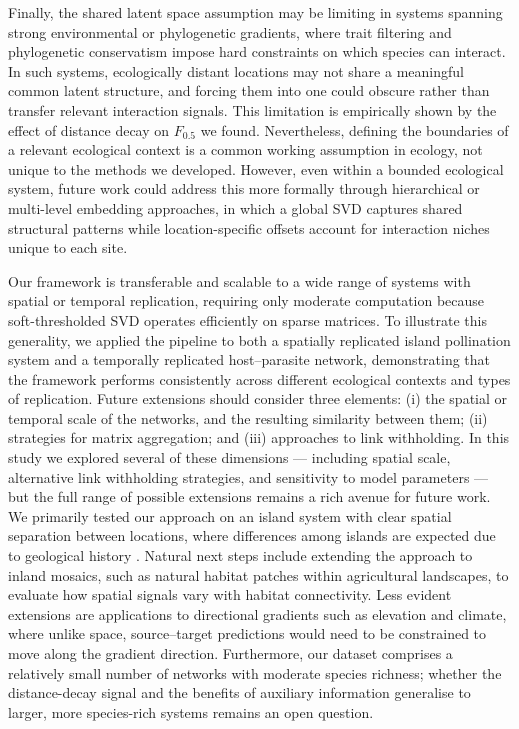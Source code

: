 \documentclass[oneside, a4paper, onecolumn, 11pt]{article}
\newcommand{\revtag}[1]{\textcolor{softcoral}{[#1]}}
\begin{document}
Finally, the shared latent space assumption may be limiting in systems spanning strong environmental or phylogenetic gradients, where trait filtering and phylogenetic conservatism impose hard constraints on which species can interact. In such systems, ecologically distant locations may not share a meaningful common latent structure, and forcing them into one could obscure rather than transfer relevant interaction signals. This limitation is empirically shown by the effect of distance decay on $F_{0.5}$ we found. Nevertheless, defining the boundaries of a relevant ecological context is a common working assumption in ecology, not unique to the methods we developed. However, even within a bounded ecological system, future work could address this more formally through hierarchical or multi-level embedding approaches, in which a global SVD captures shared structural patterns while location-specific offsets account for interaction niches unique to each site. %

Our framework is transferable and scalable to a wide range of systems with spatial or temporal replication, requiring only moderate computation because soft-thresholded SVD operates efficiently on sparse matrices. To illustrate this generality, we applied the pipeline to both a spatially replicated island pollination system and a temporally replicated host–parasite network, demonstrating that the framework performs consistently across different ecological contexts and types of replication. %
Future extensions should consider three elements: (i) the spatial or temporal scale of the networks, and the resulting similarity between them; (ii) strategies for matrix aggregation; and (iii) approaches to link withholding. In this study we explored several of these dimensions — including spatial scale, alternative link withholding strategies, and sensitivity to model parameters — but the full range of possible extensions remains a rich avenue for future work. We primarily tested our approach on an island system with clear spatial separation between locations, where differences among islands are expected due to geological history \citep{Trojelsgaard2013-we,Trojelsgaard2015-aq}. Natural next steps include extending the approach to inland mosaics, such as natural habitat patches within agricultural landscapes, to evaluate how spatial signals vary with habitat connectivity. Less evident extensions are applications to directional gradients such as elevation and climate, where unlike space, source–target predictions would need to be constrained to move along the gradient direction. Furthermore, our dataset comprises a relatively small number of networks with moderate species richness; whether the distance-decay signal and the benefits of auxiliary information generalise to larger, more species-rich systems remains an open question.
\end{document}
